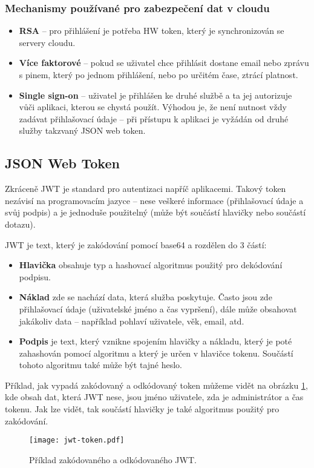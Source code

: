 \subsubsection{Mechanismy používané pro zabezpečení dat v cloudu}
\begin{itemize}
\item \textbf{RSA} -- pro přihlášení je potřeba HW token, který je synchronizován se servery cloudu.
\item \textbf{Více faktorové} -- pokud se uživatel chce přihlásit dostane email nebo zprávu s pinem, který po jednom přihlášení, nebo po určitém čase, ztrácí platnost.
\item \textbf{Single sign-on} -- uživatel je přihlášen ke druhé službě a ta jej autorizuje vůči aplikaci, kterou se chystá použít. Výhodou je, že není nutnost vždy zadávat přihlašovací údaje -- při přístupu k aplikaci je vyžádán od druhé služby takzvaný JSON web token. \cite{cloud-security}
\end{itemize}

\subsection{JSON Web Token}
\par Zkráceně JWT je standard pro autentizaci napříč aplikacemi. Takový token nezávisí na programovacím jazyce -- nese veškeré informace (přihlašovací údaje a svůj podpis) a je jednoduše použitelný (může být součástí hlavičky nebo součástí dotazu). \cite{scotch-jwt}

\par JWT je text, který je zakódování pomocí base64 a rozdělen do 3 částí:
\begin{itemize}
\item \textbf{Hlavička} obsahuje typ a hashovací algoritmus použitý pro dekódování podpisu.
\item \textbf{Náklad} zde se nachází data, která služba poskytuje. Často jsou zde přihlašovací údaje (uživatelské jméno a čas vypršení), dále může obsahovat jakákoliv data -- například pohlaví uživatele, věk, email, atd.
\item \textbf{Podpis} je text, který vznikne spojením hlavičky a nákladu, který je poté zahashován pomocí algoritmu a který je určen v hlavičce tokenu. Součástí tohoto algoritmu také může být tajné heslo. \cite{rfc-jwt}
\end{itemize}

\par Příklad, jak vypadá zakódovaný a odkódovaný token můžeme vidět na obrázku \ref{jwt-token-fig}, kde obsah dat, která JWT nese, jsou jméno uživatele, zda je administrátor a čas tokenu. Jak lze vidět, tak součástí hlavičky je také algoritmus použitý pro zakódování.

\begin{figure}[htp]
\centering
\texttt{[image: jwt-token.pdf]}
\caption{Příklad zakódovaného a odkódovaného JWT.}
\label{jwt-token-fig}
\end{figure}
